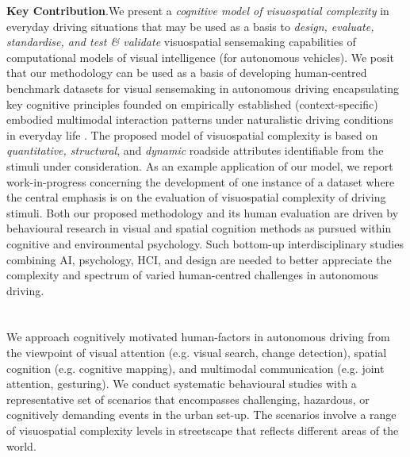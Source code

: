 \documentclass[a4paper]{article}
\begin{document}
\textbf{\sffamily Key Contribution}.\quad We present a \emph{cognitive model of visuospatial complexity} in everyday driving situations that may be used as a basis to \emph{design, evaluate, standardise, and test \& validate}  visuospatial sensemaking capabilities of computational models of visual intelligence (for autonomous vehicles). We posit that our methodology can be used as a basis of developing human-centred benchmark datasets for visual sensemaking in autonomous driving encapsulating key cognitive principles founded on empirically established (context-specific) embodied multimodal interaction patterns under naturalistic driving conditions in everyday life \cite{angrosino2007naturalistic,social-interaction-ecologica-2016}. The proposed model of visuospatial complexity is based on \emph{quantitative, structural}, and \emph{dynamic } roadside attributes identifiable from the stimuli under consideration. As an example application of our model, we report work-in-progress concerning the development of one instance of a dataset where the central emphasis is on the evaluation of visuospatial complexity of driving stimuli. Both our proposed methodology and its human evaluation are driven by behavioural research in visual and spatial cognition methods as pursued within cognitive and environmental psychology. Such bottom-up interdisciplinary studies combining AI, psychology, HCI, and design are needed to better appreciate the complexity and spectrum of varied human-centred challenges in autonomous driving.




\section{}

We approach cognitively motivated human-factors in autonomous driving from the viewpoint of visual attention (e.g. visual search, change detection), spatial cognition (e.g. cognitive mapping), and multimodal communication (e.g. joint attention, gesturing). We conduct systematic behavioural studies with a representative set of scenarios that encompasses challenging, hazardous, or cognitively demanding events in the urban set-up. The scenarios involve a range of visuospatial complexity levels in streetscape that reflects different areas of the world. 
\smallskip
\end{document}
